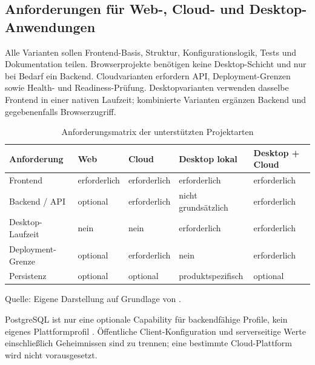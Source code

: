 \subsection{Anforderungen für Web-, Cloud- und Desktop-Anwendungen}
\label{subsec:anforderungen-plattformen}

Alle Varianten sollen Frontend-Basis, Struktur, Konfigurationslogik, Tests und
Dokumentation teilen. Browserprojekte benötigen keine Desktop-Schicht und nur
bei Bedarf ein Backend. Cloudvarianten erfordern API, Deployment-Grenzen sowie
Health- und Readiness-Prüfung. Desktopvarianten verwenden dasselbe Frontend in
einer nativen Laufzeit; kombinierte Varianten ergänzen Backend und
gegebenenfalls Browserzugriff.

\begin{table}[H]
  \centering
  \scriptsize
  \renewcommand{\arraystretch}{1.08}
  \caption{Anforderungsmatrix der unterstützten Projektarten}
  \label{tab:plattform-anforderungen}
  \begin{tabularx}{\textwidth}{@{}p{}>{\centering\arraybackslash}X>{\centering\arraybackslash}X>{\centering\arraybackslash}X>{\centering\arraybackslash}X@{}}
    \toprule
    \textbf{Anforderung} & \textbf{Web} & \textbf{Cloud} & \textbf{Desktop lokal} & \textbf{Desktop + Cloud} \\
    \midrule
    Frontend & erforderlich & erforderlich & erforderlich & erforderlich \\
    Backend / API & optional & erforderlich & nicht grundsätzlich & erforderlich \\
    Desktop-Laufzeit & nein & nein & erforderlich & erforderlich \\
    Deployment-Grenze & optional & erforderlich & nein & erforderlich \\
    Persistenz & optional & optional & produktspezifisch & optional \\
    \bottomrule
  \end{tabularx}
  \smallskip
  {\footnotesize Quelle: Eigene Darstellung auf Grundlage von
  \textcite{kleiveist2026profiles}.\par}
\end{table}

PostgreSQL ist nur eine optionale Capability für backendfähige Profile, kein
eigenes Plattformprofil \parencite{kleiveist2026profiles}. Öffentliche
Client-Konfiguration und serverseitige Werte einschließlich Geheimnissen sind
zu trennen; eine bestimmte Cloud-Plattform wird nicht vorausgesetzt.
